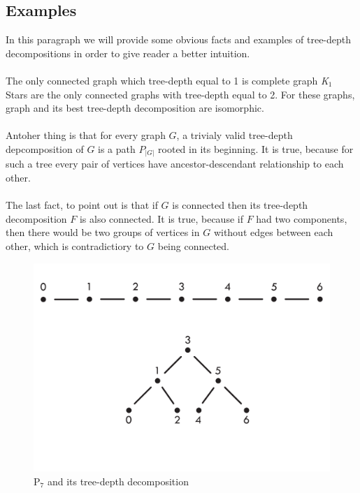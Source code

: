 \subsection{Examples}
In this paragraph we will provide some obvious facts and examples of tree-depth decompositions in order to give reader a better intuition.\\\\
The only connected graph which tree-depth equal to 1 is complete graph \emph{K$_{1}$}\\
Stars are the only connected graphs with tree-depth equal to 2.  For these graphs, graph and its best tree-depth decomposition are isomorphic.\\\\
Antoher thing is that for every graph $G$, a trivialy valid tree-depth depcomposition of $G$ is a path $P_{\left|G\right|}$ rooted in its beginning. It is true, because for such a tree every pair of vertices have ancestor-descendant relationship to each other.\\\\
The last fact, to point out is that if $G$ is connected then its tree-depth decomposition $F$ is also connected. It is true, because if $F$ had two components, then there would be two groups of vertices in $G$ without edges between each other, which is contradictiory to $G$ being connected.
\begin{figure}[hbt!]
	\centering
	\includegraphics[scale=0.5,valign=t]{sciezka.pdf}
	\caption{P$_{7}$ and its tree-depth decomposition}
\end{figure}
\\\\\\\\
